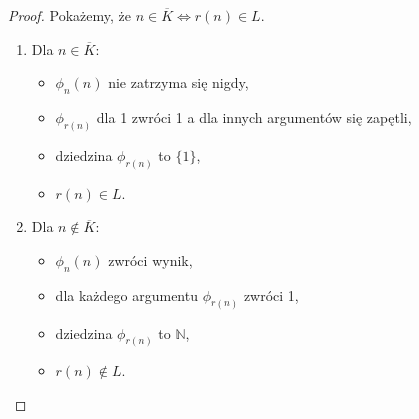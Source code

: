\documentclass{article}
\newcommand{\N}{\mathbb{N}}
\renewcommand{\complement}{\overline}
\begin{document}
\begin{proof}
    Pokażemy, że $n \in \complement{K} \iff r(n) \in L$.
    
    \begin{enumerate}
        \item Dla $n \in \complement{K}$:
            \begin{itemize}
                \item $\phi_n(n)$ nie zatrzyma się nigdy,
                \item $\phi_{r(n)}$ dla 1 zwróci 1
                    a dla innych argumentów się zapętli,
                \item dziedzina $\phi_{r(n)}$ to $\{ 1 \}$,
                \item $r(n) \in L$.
            \end{itemize}
        \item Dla $n \notin \complement{K}$:
            \begin{itemize}
                \item $\phi_n(n)$ zwróci wynik,
                \item dla każdego argumentu $\phi_{r(n)}$ zwróci 1,
                \item dziedzina $\phi_{r(n)}$ to $\N$,
                \item $r(n) \notin L$.
            \end{itemize}
    \end{enumerate}
\end{proof}
\end{document}
